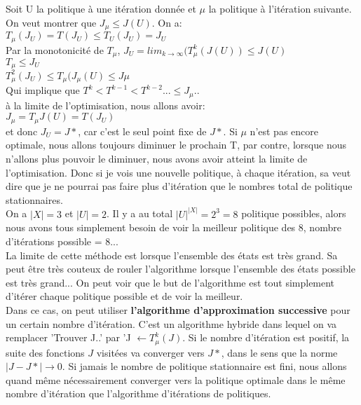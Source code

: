 \documentclass[oneside]{book}
\begin{document}
Soit U la politique à une itération donnée et $\mu$ la politique à l'itération suivante. On veut montrer que $J_{\mu} \leq J(U)$. On a:\\

$T_{\mu}(J_U) = T(J_U) \leq T_U(J_U) = J_U$\\

Par la monotonicité de $T_{\mu}$, $J_U = lim_{k \rightarrow \infty}(T_{\mu}^k(J(U)) \leq J(U)$\\

$T_{\mu} \leq J_U$\\
$T^2_{\mu}(J_U) \leq T_{\mu}(J_{\mu}(U) \leq J{\mu}$\\

Qui implique que $T^k < T^{k-1} < T^{k-2}... \leq J_{\mu}$..\\

à la limite de l'optimisation, nous allons avoir:\\

$J_{\mu} = T_{\mu}J(U) = T(J_U)$\\ 
 
et donc $J_U = J*$, car c'est le seul point fixe de $J*$. Si $\mu$ n'est pas encore optimale, nous allons toujours diminuer le prochain T, par contre, lorsque nous n'allons plus pouvoir le diminuer, nous avons avoir atteint la limite de l'optimisation. Donc si je vois une nouvelle politique, à chaque itération, sa veut dire que je ne pourrai pas faire plus d'itération que le nombres total de politique stationnaires.\\

On a $|X| = 3$ et $|U| = 2$. Il y a au total $|U|^{|X|} = 2^3 = 8$ politique possibles, alors nous avons tous simplement besoin de voir la meilleur politique des 8, nombre d'itérations possible = 8...\\

La limite de cette méthode est lorsque l'ensemble des états est très grand. Sa peut être très couteux de rouler l'algorithme lorsque l'ensemble des états possible est très grand... On peut voir que le but de l'algorithme est tout simplement d'itérer chaque politique possible et de voir la meilleur. \\

Dans ce cas, on peut utiliser \textbf{l'algorithme d'approximation successive} pour un certain nombre d'itération. C'est un algorithme hybride dans lequel on va remplacer 'Trouver J..' par 'J $\leftarrow T_{\mu}^k(J)$. Si le nombre d'itération est positif, la suite des fonctions $J$ visitées va converger vers $J*$, dans le sens que la norme $|J - J*| \rightarrow 0$. Si jamais le nombre de politique stationnaire est fini, nous allons quand même nécessairement converger vers la politique optimale dans le même nombre d'itération que l'algorithme d'itérations de politiques.\\
\end{document}
